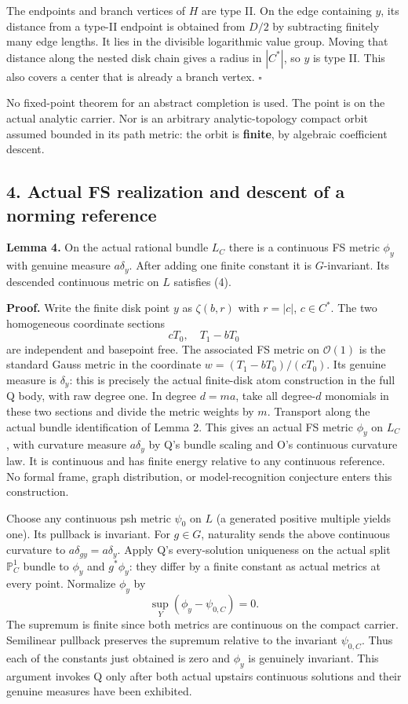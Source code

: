 \documentclass[
  11pt,
]{article}
\begin{document}
The endpoints and branch vertices of \(H\) are type II. On the edge
containing \(y\), its distance from a type-II endpoint is obtained from
\(D/2\) by subtracting finitely many edge lengths. It lies in the
divisible logarithmic value group. Moving that distance along the nested
disk chain gives a radius in \(|C^*|\), so \(y\) is type II. This also
covers a center that is already a branch vertex. \(\square\)

No fixed-point theorem for an abstract completion is used. The point is
on the actual analytic carrier. Nor is an arbitrary analytic-topology
compact orbit assumed bounded in its path metric: the orbit is
\textbf{finite}, by algebraic coefficient descent.

\subsection{4. Actual FS realization and descent of a norming
reference}\label{actual-fs-realization-and-descent-of-a-norming-reference}

\textbf{Lemma 4.} On the actual rational bundle \(L_C\) there is a
continuous FS metric \(\phi_y\) with genuine measure \(a\delta_y\).
After adding one finite constant it is \(G\)-invariant. Its descended
continuous metric on \(L\) satisfies (4).

\textbf{Proof.} Write the finite disk point \(y\) as \(\zeta(b,r)\) with
\(r=|c|\), \(c\in C^*\). The two homogeneous coordinate sections \[
cT_0,\quad T_1-bT_0
\] are independent and basepoint free. The associated FS metric on
\(\mathcal O(1)\) is the standard Gauss metric in the coordinate
\(w=(T_1-bT_0)/(cT_0)\). Its genuine measure is \(\delta_y\): this is
precisely the actual finite-disk atom construction in the full Q body,
with raw degree one. In degree \(d=ma\), take all degree-\(d\) monomials
in these two sections and divide the metric weights by \(m\). Transport
along the actual bundle identification of Lemma 2. This gives an actual
FS metric \(\phi_y\) on \(L_C\), with curvature measure \(a\delta_y\) by
Q's bundle scaling and O's continuous curvature law. It is continuous
and has finite energy relative to any continuous reference. No formal
frame, graph distribution, or model-recognition conjecture enters this
construction.

Choose any continuous psh metric \(\psi_0\) on \(L\) (a generated
positive multiple yields one). Its pullback is invariant. For
\(g\in G\), naturality sends the above continuous curvature to
\(a\delta_{gy}=a\delta_y\). Apply Q's every-solution uniqueness on the
actual split \(\mathbb P^1_C\) bundle to \(\phi_y\) and \(g^*\phi_y\):
they differ by a finite constant as actual metrics at every point.
Normalize \(\phi_y\) by \[
\sup_Y(\phi_y-\psi_{0,C})=0.
\] The supremum is finite since both metrics are continuous on the
compact carrier. Semilinear pullback preserves the supremum relative to
the invariant \(\psi_{0,C}\). Thus each of the constants just obtained
is zero and \(\phi_y\) is genuinely invariant. This argument invokes Q
only after both actual upstairs continuous solutions and their genuine
measures have been exhibited.
\end{document}
